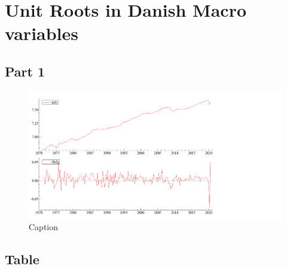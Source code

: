 \documentclass[12pt]{article}
\begin{document}
{\selectfont


\section{Unit Roots in Danish Macro variables}



\subsection{Part 1}

\begin{figure}[h!]
    \centering
    \includegraphics[scale=0.4]{Figure/fig1.png}
    \caption{Caption}
    \label{fig:my_label}
\end{figure}


\subsection{Table}













}
\end{document}

